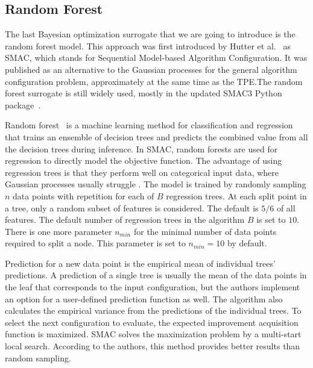 \subsection{Random Forest}
The last Bayesian optimization surrogate that we are going to introduce is the random forest model. This approach was first introduced by Hutter et al.~\cite{hutter2010sequential} as SMAC, which stands for Sequential Model-based Algorithm Configuration. It was published as an alternative to the Gaussian processes for the general algorithm configuration problem, approximately at the same time as the TPE.\@ The random forest surrogate is still widely used, mostly in the updated SMAC3 Python package~\cite{smac3}.

Random forest~\cite{breiman2001random} is a machine learning method for classification and regression that trains an ensemble of decision trees and predicts the combined value from all the decision trees during inference. In SMAC, random forests are used for regression to directly model the objective function. The advantage of using regression trees is that they perform well on categorical input data, where Gaussian processes usually struggle . The model is trained by randomly sampling $n$ data points with repetition for each of $B$ regression trees. At each split point in a tree, only a random subset of features is considered. The default is $5/6$ of all features. The default number of regression trees in the algorithm $B$ is set to $10$. There is one more parameter $n_{min}$ for the minimal number of data points required to split a node. This parameter is set to $n_{min}=10$ by default.

Prediction for a new data point is the empirical mean of individual trees' predictions. A prediction of a single tree is usually the mean of the data points in the leaf that corresponds to the input configuration, but the authors implement an option for a user-defined prediction function as well. The algorithm also calculates the empirical variance from the predictions of the individual trees. To select the next configuration to evaluate, the expected improvement acquisition function is maximized. SMAC solves the maximization problem by a multi-start local search. According to the authors, this method provides better results than random sampling.
